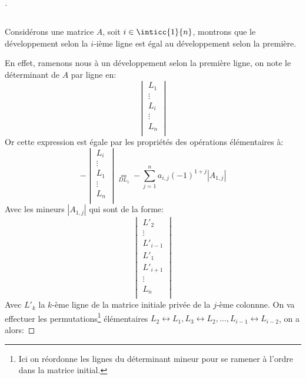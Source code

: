 \documentclass{report}
\begin{document}
   \pagebreak
   \begin{proof}[\unskip\nopunct]
      \subsection*{}
      Considérons une matrice \(A\), soit \(i \in \inticc{1}{n}\), montrons que le développement selon la \(i\)-ième ligne est égal au développement selon la première.\+

      En effet, ramenons nous à un développement selon la première ligne, on note le déterminant de \(A\) par ligne en:
      \[
         \begin{vmatrix}
            L_1\\
            \vdots\\
            L_i\\
            \vdots\\
            L_n\\
         \end{vmatrix}
      \]
      Or cette expression est égale par les propriétés des opérations élémentaires à:
      \[
         - \begin{vmatrix}
            L_i\\
            \vdots\\
            L_1\\
            \vdots\\
            L_n\\
         \end{vmatrix} \underset{DL_1}{=} - \sum_{j=1}^{n} a_{i, j} (-1)^{1 + j} \left|A_{1, j}\right|   
      \]
      Avec les mineurs \(\left|A_{1, j}\right|\) qui sont de la forme:
      \[
         \begin{vmatrix}
            L'_2\\
            \vdots\\
            L'_{i-1}\\
            L'_{1}\\
            L'_{i+1}\\
            \vdots\\
            L_n\\
         \end{vmatrix}
      \]
      Avec \(L'_k\) la \(k\)-ème ligne de la matrice initiale privée de la \(j\)-ème colonnne.
      On va effectuer les permutations\footnote[1]{Ici on réordonne les lignes du déterminant mineur pour se ramener à l'ordre dans la matrice initial.} élémentaires \(L_2 \leftrightarrow L_1, L_3 \leftrightarrow L_2, \ldots, L_{i-1} \leftrightarrow L_{i-2}\), on a alors:

\end{proof}
\end{document}
